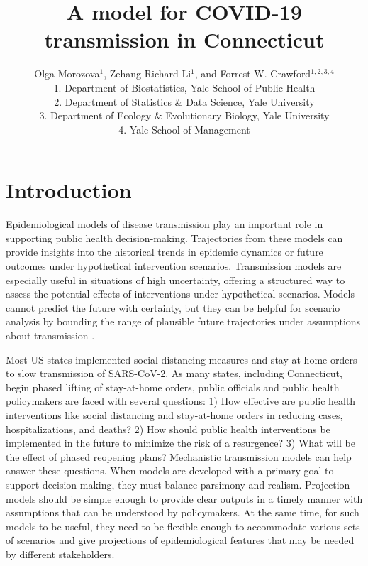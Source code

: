 \documentclass[11pt]{article}
\title{A model for COVID-19 transmission in Connecticut}
\author{Olga Morozova$^{1}$,
  Zehang Richard Li$^1$,
and Forrest W. Crawford$^{1,2,3,4}$  \\[1em]
\small 1. Department of Biostatistics, Yale School of Public Health \\
\small 2. Department of Statistics \& Data Science, Yale University \\
\small 3. Department of Ecology \& Evolutionary Biology, Yale University \\
\small 4. Yale School of Management }
\begin{document}
\maketitle




\section{Introduction}


Epidemiological models of disease transmission play an important role in supporting public health decision-making. Trajectories from these models can provide insights into the historical trends in epidemic dynamics or future outcomes under hypothetical intervention scenarios. 
Transmission models are especially useful in situations of high uncertainty, offering a structured way to assess the potential effects of interventions under hypothetical scenarios.  Models cannot predict the future with certainty, but they can be helpful for scenario analysis by bounding the range of plausible future trajectories under assumptions about transmission \citep{holmdahl2020wrong}. 

Most US states implemented social distancing measures and stay-at-home orders to slow transmission of SARS-CoV-2. 
As many states, including Connecticut, begin phased lifting of stay-at-home orders, public officials and public health policymakers are faced with several questions: 1) How effective are public health interventions like social distancing and stay-at-home orders in reducing cases, hospitalizations, and deaths? 2)  How should public health interventions be implemented in the future to minimize the risk of a resurgence? 3) What will be the effect of phased reopening plans?  Mechanistic transmission models can help answer these questions. When models are developed with a primary goal to support decision-making, they must balance parsimony and realism. Projection models should be simple enough to provide clear outputs in a timely manner with assumptions that can be understood by policymakers. At the same time, for such models to be useful, they need to be flexible enough to accommodate various sets of scenarios and give projections of epidemiological features that may be needed by different stakeholders. 
\end{document}

